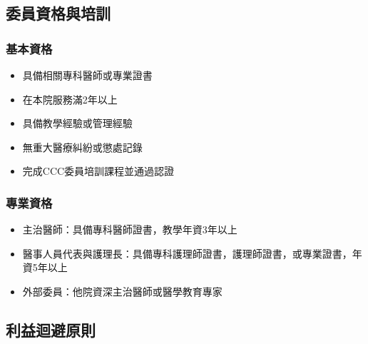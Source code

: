 \documentclass[12pt,a4paper]{article}
\begin{document}
\subsection{委員資格與培訓}
\subsubsection{基本資格}
\begin{itemize}[nosep]
    \item 具備相關專科醫師或專業證書
    \item 在本院服務滿2年以上
    \item 具備教學經驗或管理經驗
    \item 無重大醫療糾紛或懲處記錄
    \item 完成CCC委員培訓課程並通過認證
\end{itemize}
\subsubsection{專業資格}
\begin{itemize}[nosep]
    \item 主治醫師：具備專科醫師證書，教學年資3年以上
    \item 醫事人員代表與護理長：具備專科護理師證書，護理師證書，或專業證書，年資5年以上
    \item 外部委員：他院資深主治醫師或醫學教育專家
\end{itemize}
\subsection{利益迴避原則}
\end{document}

